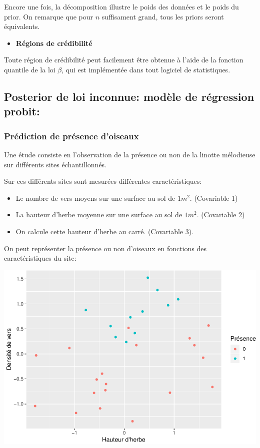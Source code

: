 \documentclass[]{article}
\providecommand{\tightlist}{%
  \setlength{\itemsep}{0pt}\setlength{\parskip}{0pt}}
\begin{document}
Encore une fois, la décomposition illustre le poids des données et le
poids du prior. On remarque que pour \(n\) suffisament grand, tous les
priors seront équivalents.

\begin{itemize}
\tightlist
\item
  \textbf{Régions de crédibilité}
\end{itemize}

Toute région de crédibilité peut facilement être obtenue à l'aide de la
fonction quantile de la loi \(\beta\), qui est implémentée dans tout
logiciel de statistiques.

\hypertarget{posterior-de-loi-inconnue-moduxe8le-de-ruxe9gression-probit}{%
\subsection{Posterior de loi inconnue: modèle de régression
probit:}\label{posterior-de-loi-inconnue-moduxe8le-de-ruxe9gression-probit}}

\hypertarget{pruxe9diction-de-pruxe9sence-doiseaux}{%
\subsubsection{Prédiction de présence
d'oiseaux}\label{pruxe9diction-de-pruxe9sence-doiseaux}}

Une étude consiste en l'observation de la présence ou non de la linotte
mélodieuse sur différents sites échantillonnés.

Sur ces différents sites sont mesurées différentes caractéristiques:

\begin{itemize}
\tightlist
\item
  Le nombre de vers moyens sur une surface au sol de \(1m^2\).
  (Covariable 1)
\item
  La hauteur d'herbe moyenne sur une surface au sol de \(1m^2\).
  (Covariable 2)
\item
  On calcule cette hauteur d'herbe au carré. (Covariable 3).
\end{itemize}

On peut représenter la présence ou non d'oiseaux en fonctions des
caractéristiques du site:

\includegraphics{poly_cours_files/figure-latex/plot_donnees_presence-1.pdf}
\end{document}
